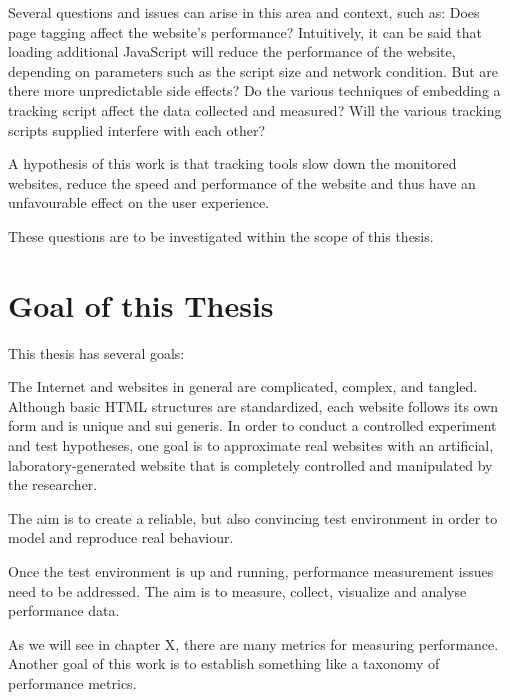 Several questions and issues can arise in this area and context, such as: Does page tagging affect the website's performance?
Intuitively, it can be said that loading additional JavaScript will reduce the performance of the website, depending on parameters such as the script size and network condition.
But are there more unpredictable side effects?
Do the various techniques of embedding a tracking script affect the data collected and measured?
Will the various tracking scripts supplied interfere with each other?

A hypothesis of this work is that tracking tools slow down the monitored websites, reduce the speed and performance of the website and thus have an unfavourable effect on the user experience.

These questions are to be investigated within the scope of this thesis.




\section{Goal of this Thesis}

This thesis has several goals:

The Internet and websites in general are complicated, complex, and tangled.
Although basic HTML structures are standardized, each website follows its own form and is unique and sui generis.
In order to conduct a controlled experiment and test hypotheses, one goal is to approximate real websites with an artificial, laboratory-generated website that is completely controlled and manipulated by the researcher.

The aim is to create a reliable, but also convincing test environment in order to model and reproduce real behaviour.

Once the test environment is up and running, performance measurement issues need to be addressed.
The aim is to measure, collect, visualize and analyse performance data.

As we will see in chapter X, there are many metrics for measuring performance.
Another goal of this work is to establish something like a taxonomy of performance metrics.






